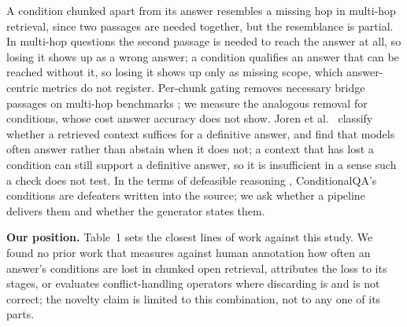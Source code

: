 A condition chunked apart from its answer resembles a missing hop in multi-hop retrieval, since two passages are needed together, but the resemblance is partial. In multi-hop questions the second passage is needed to reach the answer at all, so losing it shows up as a wrong answer; a condition qualifies an answer that can be reached without it, so losing it shows up only as missing scope, which answer-centric metrics do not register. Per-chunk gating removes necessary bridge passages on multi-hop benchmarks \cite{kumar2026verification}; we measure the analogous removal for conditions, whose cost answer accuracy does not show. Joren et al.\ \cite{joren2025sufficient} classify whether a retrieved context suffices for a definitive answer, and find that models often answer rather than abstain when it does not; a context that has lost a condition can still support a definitive answer, so it is insufficient in a sense such a check does not test. In the terms of defeasible reasoning \cite{chen2026sgdt}, ConditionalQA's conditions are defeaters written into the source; we ask whether a pipeline delivers them and whether the generator states them.

\textbf{Our position.} Table~1 sets the closest lines of work against this study. We found no prior work that measures against human annotation how often an answer's conditions are lost in chunked open retrieval, attributes the loss to its stages, or evaluates conflict-handling operators where discarding is and is not correct; the novelty claim is limited to this combination, not to any one of its parts.

